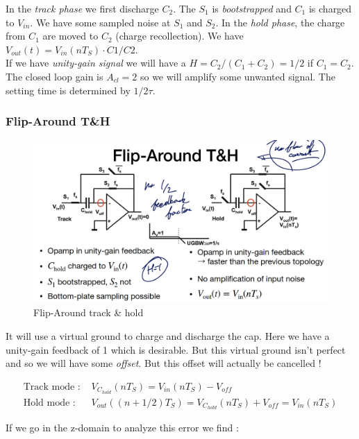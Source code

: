 \documentclass[
  a4paper,
]{article}
\begin{document}
In the \emph{track phase} we first discharge \(C_2\). The \(S_1\) is
\emph{bootstrapped} and \(C_1\) is charged to \(V_{in}\). We have some
sampled noise at \(S_1\) and \(S_2\). In the \emph{hold phase}, the
charge from \(C_1\) are moved to \(C_2\) (charge recollection). We have
\(V_{out}(t) = V_{in}(nT_S) \cdot C1/C2\).\\
If we have \emph{unity-gain signal} we will have a
\(H = C_2/(C_1+C_2) = 1/2\) if \(C_1 = C_2\). The closed loop gain is
\(A_{cl} = 2\) so we will amplify some unwanted signal. The setting time
is determined by \(1/2 \tau\).

\hypertarget{flip-around-th}{%
\subsubsection{Flip-Around T\&H}\label{flip-around-th}}

\begin{figure}
\hypertarget{fig:flip-around-label}{%
\centering
\includegraphics{img/Flip_around.png}
\caption{Flip-Around track \& hold}\label{fig:flip-around-label}
}
\end{figure}

It will use a virtual ground to charge and discharge the cap. Here we
have a unity-gain feedback of 1 which is desirable. But this virtual
ground isn't perfect and so we will have some \emph{offset}. But this
offset will actually be cancelled !

\[\begin{aligned}
    \text{Track mode : }& V_{C_{hold}} (nT_S) = V_{in}(nT_S) - V_{off} \\
    \text{Hold mode : }&  V_{out}((n+1/2)T_S) = V_{C_{hold}} (nT_S) + V_{off} = V_{in}(nT_S)
\end{aligned}\]

If we go in the z-domain to analyze this error we find :
\end{document}
